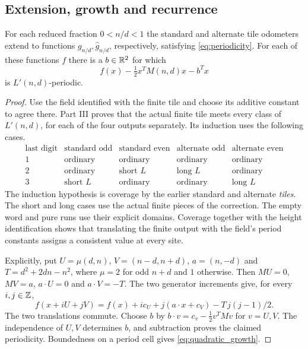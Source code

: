 \subsection*{Extension, growth and recurrence}
\begin{lemma}\label{lemma:global_odometers}
For each reduced fraction $0<n/d<1$ the standard and alternate tile odometers extend to functions $g_{n/d},\hat g_{n/d}$, respectively, satisfying \eqref{eq:periodicity}. For each of these functions $f$ there is a $b\in\mathbb{R}^2$ for which
\begin{equation}\label{eq:periodicity_growth}
     f(x)-\tfrac12 x^TM(n,d)x-b^Tx
\end{equation}
is $L'(n,d)$-periodic.
\end{lemma}
\begin{proof}
Use the field identified with the finite tile and choose its additive constant to agree there. Part III proves that the actual finite tile meets every class of $L'(n,d)$, for each of the four outputs separately. Its induction uses the following cases.
\[
\begin{array}{c|cccc}
\text{last digit}&\text{standard odd}&\text{standard even}
                 &\text{alternate odd}&\text{alternate even}\\ \hline
1&\text{ordinary}&\text{ordinary}&\text{ordinary}&\text{ordinary}\\
2&\text{ordinary}&\text{short }L&\text{long }L&\text{ordinary}\\
3&\text{short }L&\text{ordinary}&\text{ordinary}&\text{long }L
\end{array}
\]
The induction hypothesis is coverage by the earlier standard and alternate \emph{tiles}. The short and long cases use the actual finite pieces of the correction. The empty word and pure runs use their explicit domains. Coverage together with the height identification shows that translating the finite output with the field's period constants assigns a consistent value at every site.

Explicitly, put $U=\mu(d,n)$, $V=(n-d,n+d)$, $a=(n,-d)$ and $T=d^2+2dn-n^2$, where $\mu=2$ for odd $n+d$ and $1$ otherwise. Then $M U=0$, $M V=a$, $a\cdot U=0$ and $a\cdot V=-T$. The two generator increments give, for every $i,j\in\mathbb{Z}$,
\[
 f(x+iU+jV)=f(x)+i c_U+j(a\cdot x+c_V)-T\,j(j-1)/2 .
\]
The two translations commute. Choose $b$ by $b\cdot v=c_v-\tfrac12 v^TMv$ for $v=U,V$. The independence of $U,V$ determines $b$, and subtraction proves the claimed periodicity. Boundedness on a period cell gives \eqref{eq:quadratic_growth}.
\end{proof}

